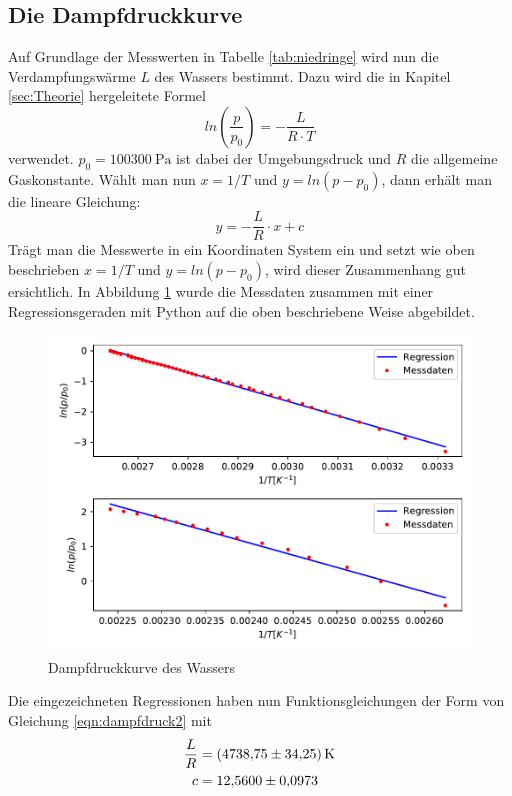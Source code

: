 \subsection{Die Dampfdruckkurve}
Auf Grundlage der Messwerten in Tabelle \ref{tab:niedringe} wird nun die Verdampfungswärme $L$ des
Wassers bestimmt. Dazu wird die in Kapitel \ref{sec:Theorie} hergeleitete Formel
\begin{equation}
  ln(\frac{p}{p_0})=-\frac{L}{R\cdot T} \label{eqn:dampfdruck1}
\end{equation}
verwendet. $p_0=\SI{100300}{\pascal}$ ist dabei der Umgebungsdruck und $R$ die allgemeine Gaskonstante.
Wählt man nun $x=1/T$ und $y=ln(p-p_0)$, dann erhält man die lineare Gleichung:
\begin{equation}
  y=-\frac{L}{R}\cdot x+c \label{eqn:dampfdruck2}
\end{equation}
Trägt man die Messwerte in ein Koordinaten System ein und setzt wie oben beschrieben $x=1/T$ und $y=ln(p-p_0)$,
wird dieser Zusammenhang gut ersichtlich. In Abbildung \ref{fig:Dampfdruckkurve} wurde die Messdaten
zusammen mit einer Regressionsgeraden mit Python auf die oben beschriebene Weise abgebildet. 
\begin{figure}
  \centering
  \includegraphics[scale = 0.75]{Auswertung/a.pdf}
  \caption{Dampfdruckkurve des Wassers}
  \label{fig:Dampfdruckkurve}
\end{figure}
Die eingezeichneten Regressionen haben nun Funktionsgleichungen der Form von Gleichung \eqref{eqn:dampfdruck2} mit
\begin{align*}
  \frac{L}{R} &= \SI{4738.75 \pm 34.25}{\kelvin} \\
  c           &= \num{12.56 \pm 0.0973} 
\end{align*}

